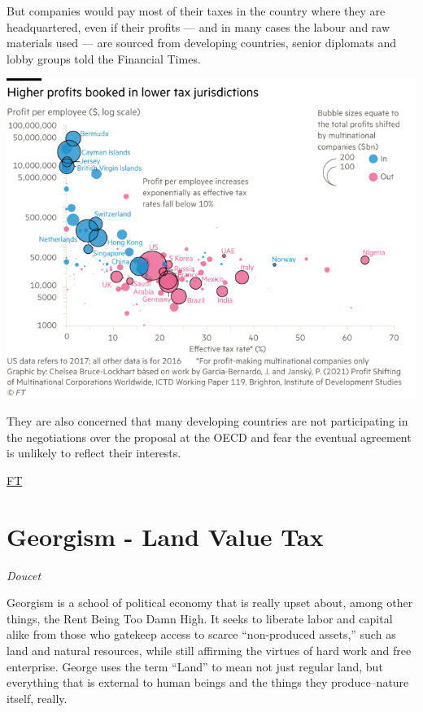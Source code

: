 \documentclass[
]{book}
\begin{document}
But companies would pay most of their taxes in the country where they are headquartered, even if their profits --- and in many cases the labour and raw materials used --- are sourced from developing countries, senior diplomats and lobby groups told the Financial Times.

\includegraphics{fig/ft_tax_shifting.png}

They are also concerned that many developing countries are not participating in the negotiations over the proposal at the OECD and fear the eventual agreement is unlikely to reflect their interests.

\href{https://www.ft.com/content/9f8304c5-5aad-4064-9218-54070981fb4d}{FT}

\hypertarget{georgism---land-value-tax}{%
\section{Georgism - Land Value Tax}\label{georgism---land-value-tax}}

\emph{Doucet}

Georgism is a school of political economy that is really upset about, among other things, the Rent Being Too Damn High. It seeks to liberate labor and capital alike from those who gatekeep access to scarce ``non-produced assets,'' such as land and natural resources, while still affirming the virtues of hard work and free enterprise. George uses the term ``Land'' to mean not just regular land, but everything that is external to human beings and the things they produce--nature itself, really.
\end{document}
